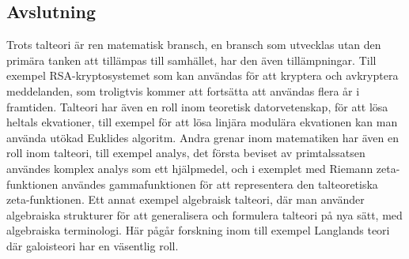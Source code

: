 \subsection*{Avslutning}
Trots talteori är ren matematisk bransch, en bransch som utvecklas utan den primära tanken att tillämpas till samhället, har den även tillämpningar. Till exempel RSA-kryptosystemet som kan användas för att kryptera och avkryptera meddelanden, som troligtvis kommer att fortsätta att användas flera år i framtiden. Talteori har även en roll inom teoretisk datorvetenskap, för att lösa heltals ekvationer, till exempel för att lösa linjära modulära ekvationen kan man använda utökad Euklides algoritm. Andra grenar inom matematiken har även en roll inom talteori, till exempel analys, det första beviset av primtalssatsen användes komplex analys som ett hjälpmedel, och i exemplet med Riemann zeta-funktionen användes gammafunktionen för att representera den talteoretiska zeta-funktionen. Ett annat exempel algebraisk talteori, där man använder algebraiska strukturer för att generalisera och formulera talteori på nya sätt, med algebraiska terminologi. Här pågår forskning inom till exempel Langlands teori där galoisteori har en väsentlig roll.
